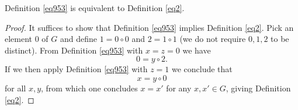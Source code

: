\begin{theorem}[953 is equivalent to 2]\label{953_equiv_2}  Definition \ref{eq953} is equivalent to Definition \ref{eq2}.
\end{theorem}

\begin{proof}  It suffices to show that Definition \ref{eq953} implies Definition \ref{eq2}.  Pick an element $0$ of $G$ and define $1 = 0 \circ 0$ and $2 = 1 \circ 1$ (we do not require $0,1,2$ to be distinct).
From Definition \ref{eq953} with $x=z=0$ we have
$$ 0 = y \circ 2.$$
If we then apply Definition \ref{eq953} with $z=1$ we conclude that
$$ x = y \circ 0$$
for all $x,y$, from which one concludes $x=x'$ for any $x,x' \in G$, giving Definition \ref{eq2}.
\end{proof}
